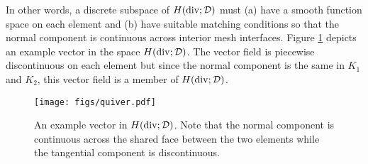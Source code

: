 \documentclass[../doc.tex]{subfiles}
\begin{document}
In other words, a discrete subspace of $H(\operatorname{div};\mathcal{D})$ must (a) have a smooth function space on each element and (b) have suitable matching conditions so that the normal component is continuous across interior mesh interfaces. 
Figure \ref{fem:quiver} depicts an example vector in the space $H(\operatorname{div};\mathcal{D})$. The vector field is piecewise discontinuous on each element but since the normal component is the same in $K_1$ and $K_2$, this vector field is a member of $H(\operatorname{div};\mathcal{D})$. 
\begin{figure}
	\centering
	\texttt{[image: figs/quiver.pdf]}
	\caption{An example vector in $H(\operatorname{div};\mathcal{D})$. Note that the normal component is continuous across the shared face between the two elements while the tangential component is discontinuous. }
	\label{fem:quiver}
\end{figure}
\end{document}
